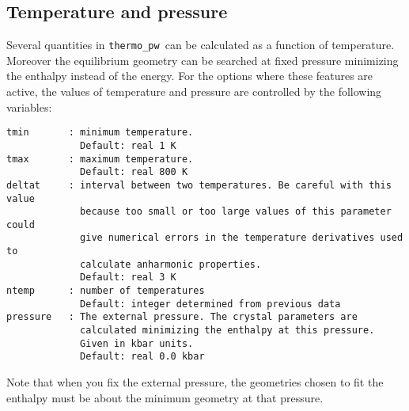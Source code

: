 \documentclass[12pt,a4paper]{article}
\def\thermo{\texttt{thermo\_pw}}
\begin{document}
\subsection{\color{web-blue}Temperature and pressure}
Several quantities in \thermo\ can be calculated as a function of temperature.
Moreover the equilibrium geometry can be searched at fixed pressure 
minimizing the enthalpy instead of the energy.
For the options where these features are active, the values of temperature
and pressure are controlled by the following variables:
\begin{verbatim}
tmin       : minimum temperature.
             Default: real 1 K
tmax       : maximum temperature.
             Default: real 800 K
deltat     : interval between two temperatures. Be careful with this value
             because too small or too large values of this parameter could 
             give numerical errors in the temperature derivatives used to 
             calculate anharmonic properties.
             Default: real 3 K
ntemp      : number of temperatures
             Default: integer determined from previous data
pressure   : The external pressure. The crystal parameters are
             calculated minimizing the enthalpy at this pressure. 
             Given in kbar units. 
             Default: real 0.0 kbar
\end{verbatim}
Note that when you fix the external pressure, the geometries chosen to 
fit the enthalpy must be about the minimum geometry at that pressure.
\end{document}
